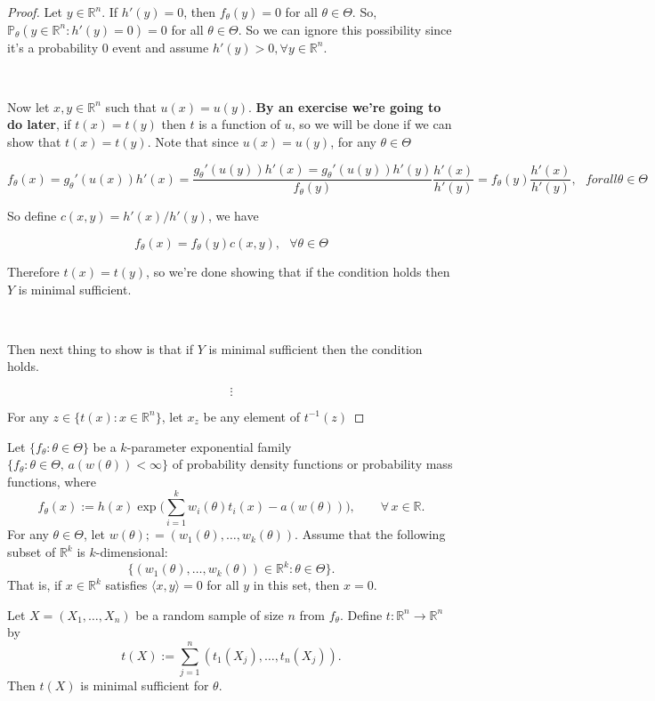 \begin{proof}
Let \(y \in \mathbb{R}^n\). If \(h'(y) = 0\), then \(f_\theta(y) = 0\) for all \(\theta \in \Theta\). So, \(\mathbb{P}_\theta(y \in \mathbb{R}^n : h'(y) =0) = 0\) for all \(\theta \in \Theta\). So we can ignore this possibility since it's a probability 0 event and assume \(h'(y) > 0, \forall y \in \mathbb{R}^n\).

\

Now let \(x, y \in \mathbb{R}^n\) such that \(u(x) = u(y)\). \textbf{By an exercise we're going to do later}, if \(t(x) = t(y)\) then \(t\) is a function of \(u\), so we will be done if we can show that \(t(x) = t(y)\).  Note that  since \(u(x) = u(y)\), for any \(\theta \in \Theta \)

\[
f_\theta(x) = g_\theta'(u(x)) h'(x) = \frac{g_\theta'(u(y))h'(x) = g_\theta'(u(y)) h'(y) }{f_\theta(y)} \frac{h'(x)}{h'(y)} = f_\theta(y) \frac{h'(x)}{h'(y)}, \ \ \ forall \theta \in \Theta
\]

So define \(c(x,y) = h'(x)/h'(y)\), we have 

\[
f_\theta(x) = f_\theta(y) c(x,y), \ \ \ \forall \theta \in \Theta
\]

Therefore \(t(x) = t(y)\), so we're done showing that if the condition holds then \(Y\) is minimal sufficient. 

\

Then next thing to show is that if \(Y\) is minimal sufficient then the condition holds.

\[
\vdots
\]

For any \(z \in \{t(x): x \in \mathbb{R}^n\}\), let \(x_z\) be any element of \(t^{-1}(z)\)

\end{proof}

\begin{proposition}\label{mathstats.541a.ex.5.10} Let $\{f_{\theta}:\theta\in\Theta\}$ be a $k$-parameter exponential family $\{f_{\theta}:\theta\in \Theta,\,a(w(\theta))<\infty\}$ of probability density functions or probability mass functions, where
$$f_{\theta}(x):= h(x)\exp\Big(\sum_{i=1}^{k}w_{i}(\theta)t_{i}(x)-a(w(\theta))\Big),\qquad\forall\,x\in\mathbb{R}.$$ For any $\theta\in\Theta$, let $w(\theta);= (w_{1}(\theta),\ldots,w_{k}(\theta))$.  
Assume that the following subset of $\mathbb{R}^{k}$ is $k$-dimensional:
$$\{(w_{1}(\theta),\ldots,w_{k}(\theta))\in\mathbb{R}^{k}:\theta\in\Theta\}.$$
That is, if $x\in\mathbb{R}^{k}$ satisfies $\langle x,y\rangle=0$ for all $y$ in this set, then $x=0$.  

Let $X=(X_{1},\ldots,X_{n})$ be a random sample of size $n$ from $f_{\theta}$.  Define $t:\mathbb{R}^{n}\to\mathbb{R}^{n}$ by
$$t(X):=\sum_{j=1}^{n}\left(t_{1}(X_{j}),\ldots,t_{n}(X_{j})\right).$$
Then $t(X)$ is minimal sufficient for $\theta$.






\end{proposition}

